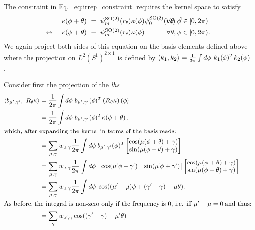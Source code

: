 \documentclass{article}
\newcommand{\lp}{\left(}
\newcommand{\rp}{\right)}
\newcommand{\SO}[1]{\ensuremath{\operatorname{SO}(#1)}}
\begin{document}
The constraint in Eq.~\eqref{eq:irrep_constraint} requires the kernel space to satisfy
\begin{align*}
	\kappa(\phi + \theta)\ &=\ \psi_m^{\SO2}(r_\theta)\kappa(\phi) \psi_0^{\SO2}(r_\theta)^{-1} \mkern-60mu&\forall\theta,\phi\in[0,2\pi)&\\
	\Leftrightarrow\quad
	\kappa(\phi + \theta)\ &=\ \psi_m^{\SO2}(r_\theta)\kappa(\phi) \mkern-60mu&\forall\theta,\phi\in[0,2\pi)&.
\end{align*}
We again project both sides of this equation on the basis elements defined above where the projection on $L^2(S^1)^{2\times1}$ is defined by
$\langle k_1, k_2\rangle = {1\over2\pi}\int d\phi\ k_1(\phi)^T k_2(\phi)$.

Consider first the projection of the \textit{lhs}
\begin{align*}
	\langle b_{\mu',\gamma'},\ R_{\theta} \kappa \rangle
	&= {1\over2\pi}\int d\phi \ b_{\mu',\gamma'}(\phi)^T \lp R_{\theta} \kappa\rp(\phi) \\
	&= {1\over2\pi}\int d\phi \ b_{\mu',\gamma'}(\phi)^T \kappa(\phi + \theta)\,, \\
\intertext{which, after expanding the kernel in terms of the basis reads:}
	&= \sum_{\mu, \gamma} w_{\mu, \gamma} {1\over2\pi}\int d\phi \ b_{\mu',\gamma'}(\phi)^T 
	\begin{bmatrix} \cos(\mu(\phi + \theta) + \gamma) \\ \sin(\mu(\phi + \theta) + \gamma) \end{bmatrix} \\
	&= \sum_{\mu, \gamma} w_{\mu, \gamma} {1\over2\pi}\int d\phi \ 
	\begin{bmatrix} \cos(\mu'\phi + \gamma') & \sin(\mu'\phi + \gamma') \end{bmatrix}
	\begin{bmatrix} \cos(\mu(\phi + \theta) + \gamma) \\ \sin(\mu(\phi + \theta) + \gamma) \end{bmatrix} \\
&= \sum_{\mu, \gamma} w_{\mu, \gamma} {1\over2\pi}\int d\phi \ 
	\cos((\mu' - \mu) \phi + (\gamma' -\gamma) - \mu\theta). \\
\intertext{As before, the integral is non-zero only if the frequency is $0$, i.e. iff $\mu' - \mu = 0$ and thus:}
	&= \sum_{\gamma} w_{\mu', \gamma} \cos((\gamma' -\gamma) - \mu'\theta)
\end{align*}
\end{document}
